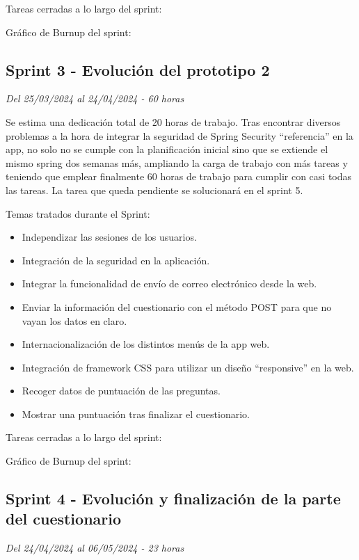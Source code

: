 Tareas cerradas a lo largo del sprint:

Gráfico de Burnup del sprint:


\subsection{Sprint 3 - Evolución del prototipo 2}
\textit{Del 25/03/2024 al 24/04/2024 - 60 horas}

Se estima una dedicación total de 20 horas de trabajo.
Tras encontrar diversos problemas a la hora de integrar la seguridad de Spring Security ``referencia'' en la app, no solo no se cumple con la planificación inicial sino que se extiende el mismo spring dos semanas más, ampliando la carga de trabajo con más tareas y teniendo que emplear finalmente 60 horas de trabajo para cumplir con casi todas las tareas.
La tarea que queda pendiente se solucionará en el sprint 5.

Temas tratados durante el Sprint:
\begin{itemize}
	\item
	Independizar las sesiones de los usuarios.
	\item
	Integración de la seguridad en la aplicación.
	\item
	Integrar la funcionalidad de envío de correo electrónico desde la web.
	\item
	Enviar la información del cuestionario con el método POST para que no vayan los datos en claro.
	\item
	Internacionalización de los distintos menús de la app web.
	\item
	Integración de framework CSS para utilizar un diseño ``responsive'' en la web.
	\item
	Recoger datos de puntuación de las preguntas.
	\item
	Mostrar una puntuación tras finalizar el cuestionario.
\end{itemize}

Tareas cerradas a lo largo del sprint:

Gráfico de Burnup del sprint:


\subsection{Sprint 4 - Evolución y finalización de la parte del cuestionario}
\textit{Del 24/04/2024 al 06/05/2024 - 23 horas}

